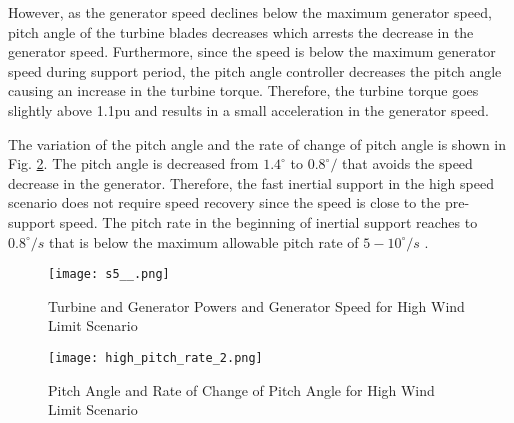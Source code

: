 However, as the generator speed declines below the maximum generator speed,
pitch angle of the turbine blades decreases which arrests the decrease in the generator
speed. Furthermore, since the speed is below the maximum generator speed during support period, the pitch angle controller decreases the pitch angle causing an increase in the turbine torque. Therefore, the turbine torque goes slightly above 1.1pu and results in a small acceleration in the generator speed. \par
The variation of the pitch angle and the rate of change of pitch angle is shown in Fig. \ref{pitch_rate}. The pitch angle is decreased from $1.4^{\circ}$ to $0.8^{\circ}/$ that avoids the speed decrease in the generator. Therefore, the fast inertial support in the high speed scenario does not require speed recovery since the speed is close to the pre-support speed. The pitch rate in the beginning of inertial support reaches to $0.8^{\circ}/s$ that is below the maximum allowable pitch rate of $5-10^{\circ}/s$ \cite{Ackermann2005a}. \par
\begin{figure}[h]
	\centering
	\texttt{[image: s5\_\_.png]}
	\caption{Turbine and Generator Powers and Generator Speed for High Wind Limit Scenario}
	\label{high_limit_speed}
\end{figure}
\begin{figure}[h]
	\centering
	\texttt{[image: high\_pitch\_rate\_2.png]}
	\caption{Pitch Angle and Rate of Change of Pitch Angle for High Wind Limit Scenario}
	\label{pitch_rate}
\end{figure}

